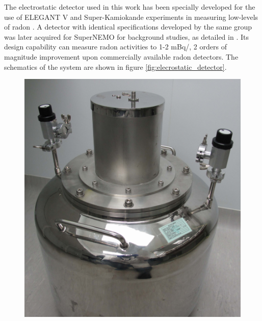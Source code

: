 The electrostatic detector used in this work has been specially developed for the use of ELEGANT V and Super-Kamiokande experiments in measuring low-levels of radon \cite{CHOI2001177, MITSUDA2003414}. A detector with identical specifications developed by the same group was later acquired for SuperNEMO for background studies, as detailed in \cite{mott_2013}. Its design capability can measure radon activities to 1-2 mBq/\cubicmeter{}, 2 orders of magnitude improvement upon commercially available radon detectors. The schematics of the system are shown in figure \ref{fig:elecrostatic_detector}. 
%
\begin{figure}[h!]
    \centering
    \includegraphics[scale=0.3]{Chapter_4/Figures/electrostatic_detector_1.png}

\end{figure}
